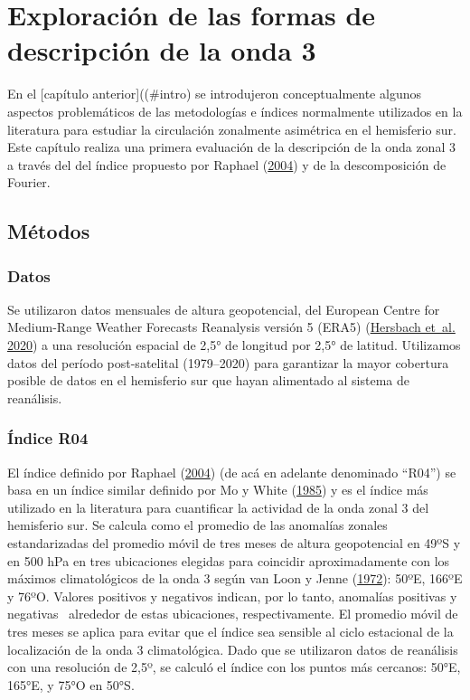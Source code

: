 \documentclass[12pt,oneside,a4paper]{reedthesis}
\begin{document}
\hypertarget{onda3}{%
\chapter{Exploración de las formas de descripción de la onda 3}\label{onda3}}

En el {[}capítulo anterior{]}((\#intro) se introdujeron conceptualmente algunos aspectos problemáticos de las metodologías e índices normalmente utilizados en la literatura para estudiar la circulación zonalmente asimétrica en el hemisferio sur.
Este capítulo realiza una primera evaluación de la descripción de la onda zonal 3 a través del del índice propuesto por Raphael (\protect\hyperlink{ref-raphael2004}{2004}) y de la descomposición de Fourier.

\hypertarget{muxe9todos}{%
\section{Métodos}\label{muxe9todos}}

\hypertarget{datos}{%
\subsection{Datos}\label{datos}}

Se utilizaron datos mensuales de altura geopotencial, del European Centre for Medium-Range Weather Forecasts Reanalysis versión 5 (ERA5) (\protect\hyperlink{ref-hersbach2020}{Hersbach et~al. 2020}) a una resolución espacial de 2,5° de longitud por 2,5° de latitud.
Utilizamos datos del período post-satelital (1979--2020) para garantizar la mayor cobertura posible de datos en el hemisferio sur que hayan alimentado al sistema de reanálisis.

\hypertarget{uxedndice-r04}{%
\subsection{Índice R04}\label{uxedndice-r04}}

El índice definido por Raphael (\protect\hyperlink{ref-raphael2004}{2004}) (de acá en adelante denominado ``R04'') se basa en un índice similar definido por Mo y White (\protect\hyperlink{ref-mo1985}{1985}) y es el índice más utilizado en la literatura para cuantificar la actividad de la onda zonal 3 del hemisferio sur.
Se calcula como el promedio de las anomalías zonales estandarizadas del promedio móvil de tres meses de altura geopotencial en 49ºS y en 500 hPa en tres ubicaciones elegidas para coincidir aproximadamente con los máximos climatológicos de la onda 3 según van Loon y Jenne (\protect\hyperlink{ref-vanloon1972}{1972}): 50ºE, 166ºE y 76ºO.
Valores positivos y negativos indican, por lo tanto, anomalías positivas y negativas~ alrededor de estas ubicaciones, respectivamente.
El promedio móvil de tres meses se aplica para evitar que el índice sea sensible al ciclo estacional de la localización de la onda 3 climatológica.
Dado que se utilizaron datos de reanálisis con una resolución de 2,5º, se calculó el índice con los puntos más cercanos: 50°E, 165°E, y 75°O en 50°S.
\end{document}
